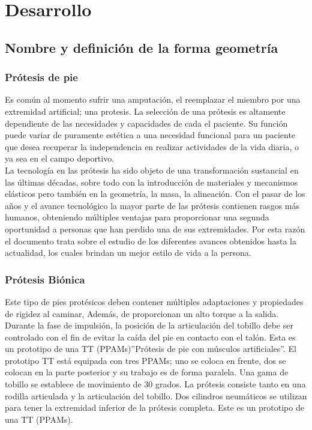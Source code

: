 \documentclass{article}
\begin{document}
\section{Desarrollo}
\subsection{Nombre y definición de la forma geometría}
\subsubsection{Prótesis de pie}
Es común al momento sufrir una amputación, el  reemplazar el miembro por una extremidad artificial; una protesis. La selección de una prótesis es altamente dependiente de las necesidades y capacidades de cada el paciente. Su función puede variar de puramente estética a una necesidad funcional para un paciente que desea recuperar la independencia en realizar actividades de la vida diaria, o ya sea en el campo deportivo.\\
La tecnología en las prótesis ha sido objeto de una transformación sustancial en las últimas décadas, sobre todo con la introducción de materiales y mecanismos elásticos pero también en la geometría, la masa, la alineación. Con el pasar de los años y el avance tecnológico la mayor parte de las prótesis contienen rasgos más humanos, obteniendo múltiples ventajas para proporcionar una segunda oportunidad a personas que han perdido una de sus extremidades\cite{rf1}. Por esta razón el  documento trata sobre el estudio de los diferentes avances obtenidos hasta la actualidad, los cuales brindan un mejor estilo de vida a la persona.
\subsubsection{Prótesis Biónica} Este tipo de pies protésicos deben contener múltiples adaptaciones y  propiedades de rigidez al caminar, Además, de proporcionan un alto torque a la salida. Durante la fase de impulsión, la posición de la articulación del tobillo debe ser controlado con el fin de evitar la caída del pie en contacto con el talón. Esta es un prototipo de una TT (PPAMs)”Prótesis de pie con músculos artificiales”. El prototipo TT está equipada con tres PPAMs; uno se coloca en frente, dos se colocan en la parte posterior y su trabajo es de forma paralela. Una gama de tobillo se establece de movimiento de 30 grados. La  prótesis consiste tanto en una rodilla articulada y la articulación del tobillo. Dos cilindros neumáticos se utilizan para tener la extremidad inferior de la prótesis completa. Este es un prototipo de una TT (PPAMs).
\newpage
\end{document}
